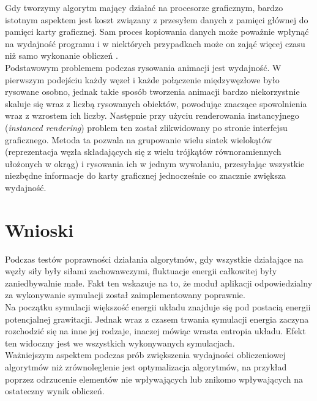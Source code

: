 \documentclass[12pt, letterpaper]{report}
\begin{document}
    Gdy tworzymy algorytm mający działać na procesorze graficznym, bardzo istotnym aspektem jest 
    koszt związany z przesyłem danych z pamięci głównej do pamięci karty graficznej. Sam proces kopiowania 
    danych może poważnie wpłynąć na wydajność programu i w niektórych przypadkach może on zająć więcej
    czasu niż samo wykonanie obliczeń \cite{cuda}. \\

    Podstawowym problemem podczas rysowania animacji jest wydajność. 
    W pierwszym podejściu każdy węzeł i każde połączenie międzywęzłowe było rysowane osobno,
    jednak takie sposób tworzenia animacji bardzo niekorzystnie skaluje się wraz z liczbą rysowanych
    obiektów, powodując znaczące spowolnienia wraz z wzrostem ich liczby.
    Następnie przy użyciu renderowania instancyjnego (\emph{instanced rendering}) 
    problem ten został zlikwidowany po stronie interfejsu graficznego. 
    Metoda ta pozwala na grupowanie wielu siatek wielokątów 
    (reprezentacja węzła składających się z wielu trójkątów równoramiennych ułożonych w okrąg) i
    rysowania ich w jednym wywołaniu, przesyłając wszystkie niezbędne informacje do karty 
    graficznej jednocześnie co znacznie zwiększa wydajność.
    
    \clearpage
    \section{Wnioski}
    
    Podczas testów poprawności działania algorytmów, gdy wszystkie działające na węzły siły były siłami 
    zachowawczymi, fluktuacje energii całkowitej były zaniedbywalnie małe. Fakt ten wskazuje na to, że 
    moduł aplikacji odpowiedzialny za wykonywanie symulacji został zaimplementowany poprawnie. \\

    Na początku symulacji większość energii układu znajduje się pod postacią energii potencjalnej grawitacji.
    Jednak wraz z czasem trwania symulacji energia zaczyna rozchodzić się na inne jej rodzaje, inaczej mówiąc
    wrasta entropia układu. Efekt ten widoczny jest we wszystkich wykonywanych symulacjach. \\

    Ważniejszym aspektem podczas prób zwiększenia wydajności obliczeniowej algorytmów niż zrównoleglenie jest optymalizacja
    algorytmów, na przykład poprzez odrzucenie elementów nie wpływających lub znikomo wpływających 
    na ostateczny wynik obliczeń. 
\end{document}
